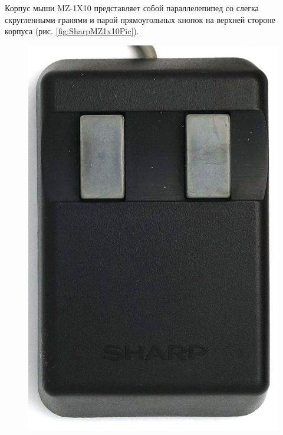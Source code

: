 \documentclass[11pt, a4paper]{article}
\begin{document}
Корпус мыши MZ-1X10 представляет собой параллелепипед со слегка скругленными гранями и парой прямоугольных кнопок на верхней стороне корпуса (рис.  \ref{fig:SharpMZ1x10Pic}). 
\begin{figure}[h]
    \centering
    \includegraphics[scale=0.55]{1983_sharp_mz_1x10_mouse/top_15.jpg}

\end{figure}
\end{document}
